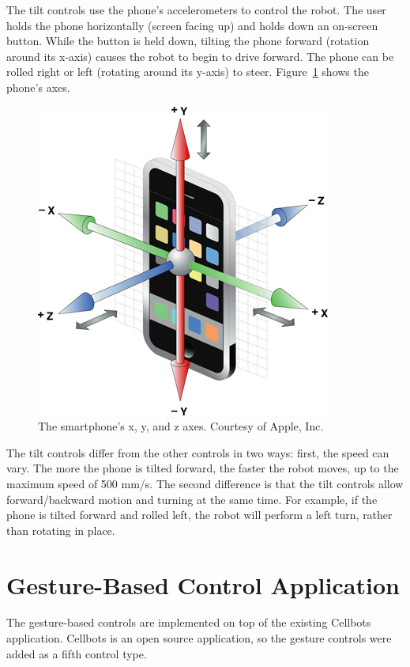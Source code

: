 \documentclass[12pt, letterpaper]{report}
\begin{document}
The tilt controls use the phone's accelerometers to control the robot. The user holds the phone horizontally (screen facing up) and holds down an on-screen button. While the button is held down, tilting the phone forward (rotation around its x-axis) causes the robot to begin to drive forward. The phone can be rolled right or left (rotating around its y-axis) to steer. Figure~\ref{acceleration_axes} shows the phone's axes.

\begin{figure}[h]
	\centering
	\includegraphics[scale=0.5]{images/acceleration_axes}
	\caption{The smartphone's x, y, and z axes. Courtesy of Apple, Inc.\cite{acceleration}}
	\label{acceleration_axes} 
\end{figure}

The tilt controls differ from the other controls in two ways: first, the speed can vary. The more the phone is tilted forward, the faster the robot moves, up to the maximum speed of 500 mm/s.  The second difference is that the tilt controls allow forward/backward motion and turning at the same time. For example, if the phone is tilted forward and rolled left, the robot will perform a left turn, rather than rotating in place.

\section{Gesture-Based Control Application}
The gesture-based controls are implemented on top of the existing Cellbots application. Cellbots is an open source application, so the gesture controls were added as a fifth control type. 
\end{document}
